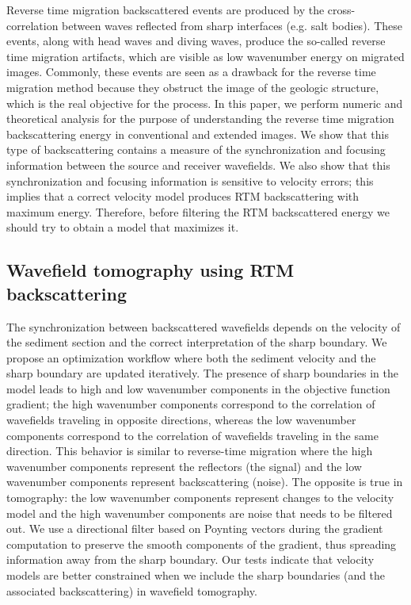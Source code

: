 Reverse time migration backscattered events are produced by the cross-correlation between waves reflected from 
sharp interfaces (e.g. salt bodies). These events, along with head waves and diving waves, produce
the so-called {reverse time migration} artifacts, which are visible as low wavenumber energy on migrated images. 
Commonly, these events are seen as a drawback for the  {reverse time migration} method because they obstruct the image of the geologic
structure, which is the real objective for the process.
 In this paper, we perform numeric and theoretical analysis for the purpose of understanding the {reverse time migration} backscattering
energy in conventional and extended images.  We show that this type of backscattering contains a measure of the synchronization
 and focusing information between the source and receiver wavefields. We also show  that this synchronization and focusing information
 is sensitive to velocity errors; this implies that a correct velocity model produces RTM backscattering with maximum energy. Therefore, before
filtering the RTM backscattered energy we should try to obtain a model that maximizes it.



\subsection{Wavefield tomography using RTM backscattering \citep{diaz2015}}
The synchronization between backscattered wavefields depends on the velocity of the sediment section and the correct
interpretation of the sharp boundary. We propose an optimization workflow where
both the sediment velocity and the sharp boundary are updated iteratively. 
The presence of sharp boundaries in the model leads to high and low wavenumber 
components in the objective function gradient; the high wavenumber components
correspond to the correlation of wavefields traveling in opposite directions,
 whereas the low wavenumber components correspond to the correlation
of wavefields traveling in the same direction. 
This behavior is similar to  
reverse-time migration where the high wavenumber components represent the 
reflectors (the signal) and the low wavenumber components represent 
backscattering (noise). The opposite is true in tomography: the low 
wavenumber components represent changes to the velocity model and
 the high wavenumber components are noise that needs to be filtered out.
We use a directional filter based on Poynting vectors during the
 gradient computation to preserve the smooth components of the gradient, thus
spreading information away from the sharp boundary.
Our tests indicate that velocity models are better constrained when we include
the sharp boundaries (and the associated backscattering) in wavefield tomography.


